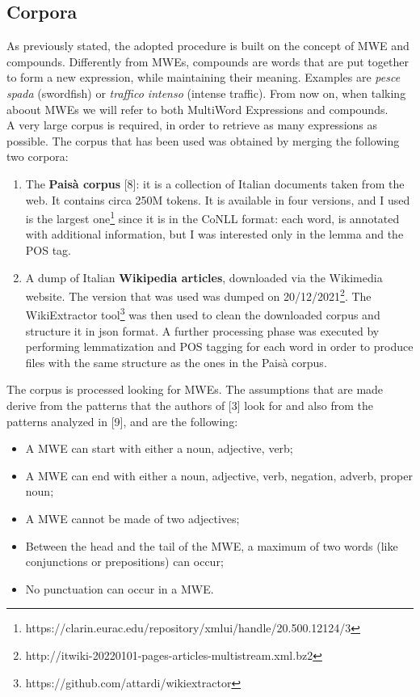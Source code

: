 \documentclass[twoside,twocolumn]{article}
\begin{document}
	\subsection{Corpora}
	As previously stated, the adopted procedure is built on the concept of MWE and compounds. Differently from MWEs, compounds are words that are put together to form a new expression, while maintaining their meaning. Examples are \textit{pesce spada} (swordfish) or \textit{traffico intenso} (intense traffic). From now on, when talking aboout MWEs we will refer to both MultiWord Expressions and compounds. \\ 
	A very large corpus is required, in order to retrieve as many expressions as possible. The corpus that has been used was obtained by merging the following two corpora:
	\begin{enumerate}
	\item The \textbf{Paisà corpus} [8]: it is a collection of Italian documents taken from the web. It contains circa 250M tokens. It is available in four versions, and I used is the largest one\footnote{https://clarin.eurac.edu/repository/xmlui/handle/20.500.12124/3} since it is in the CoNLL format: each word, is annotated with additional information, but I was interested only in the lemma and the POS tag.
	\item A dump of Italian \textbf{Wikipedia articles}, downloaded via the Wikimedia website. The version that was used was dumped on 20/12/2021\footnote{http://itwiki-20220101-pages-articles-multistream.xml.bz2}. The WikiExtractor tool\footnote{https://github.com/attardi/wikiextractor} was then used to clean the downloaded corpus and structure it in json format. A further processing phase was executed by performing lemmatization and POS tagging for each word in order to produce files with the same structure as the ones in the Paisà corpus. 
	\end{enumerate}
	The corpus is processed looking for MWEs. The assumptions that are made derive from the patterns that the authors of [3] look for and also from the patterns analyzed in [9], and are the following:
	\begin{itemize}
	\item A MWE can start with either a noun, adjective, verb;
	\item A MWE can end with either a noun, adjective, verb, negation, adverb, proper noun;
	\item A MWE cannot be made of two adjectives;
	\item Between the head and the tail of the MWE, a maximum of two words (like conjunctions or prepositions) can occur;
	\item No punctuation can occur in a MWE.
	\end{itemize}
\end{document}
